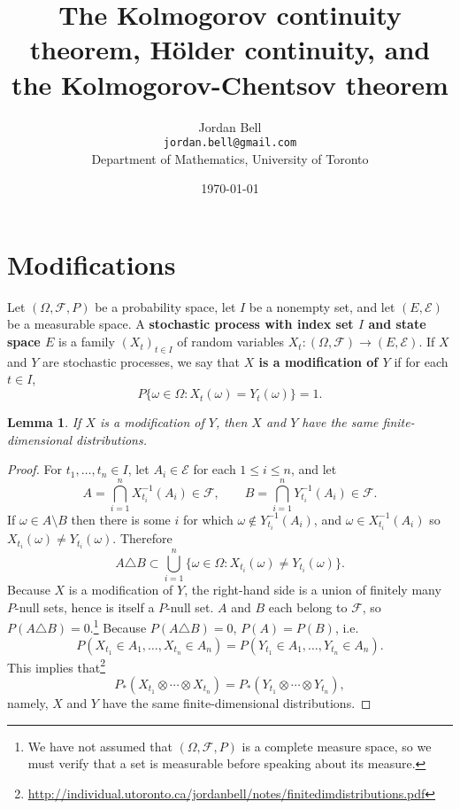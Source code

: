 \documentclass{article}
\newtheorem{lemma}[theorem]{Lemma}
\theoremstyle{definition}
\begin{document}
\title{The Kolmogorov continuity theorem, H\"older continuity, and the Kolmogorov-Chentsov theorem}
\author{Jordan Bell\\ \texttt{jordan.bell@gmail.com}\\Department of Mathematics, University of Toronto}
\date{\today}

\maketitle

\section{Modifications}
Let $(\Omega,\mathscr{F},P)$ be a probability space, let $I$ be a nonempty set, and let
$(E,\mathscr{E})$ be a measurable space. A \textbf{stochastic process with index set $I$ and state space $E$} is a family 
$(X_t)_{t \in I}$ of random variables $X_t:(\Omega,\mathscr{F}) \to (E,\mathscr{E})$.
If $X$ and $Y$ are stochastic processes, we say that \textbf{$X$ is a modification of $Y$} if 
for each $t \in I$, 
\[
P\{\omega \in \Omega: X_t(\omega)=Y_t(\omega)\}=1.
\]

\begin{lemma}
If $X$ is a modification of $Y$, then $X$ and $Y$ have the same finite-dimensional distributions.
\end{lemma}
\begin{proof}
For $t_1,\ldots,t_n \in  I$, let $A_i \in \mathscr{E}$ for each $1 \leq i \leq n$, and let
\[
A = \bigcap_{i=1}^n X_{t_i}^{-1}(A_i) \in \mathscr{F}, \qquad B = \bigcap_{i=1}^n Y_{t_i}^{-1}(A_i) \in \mathscr{F}.
\]
If $\omega \in A \setminus B$ then there is some $i$ for which $\omega \not \in Y_{t_i}^{-1}(A_i)$, and
$\omega \in X_{t_i}^{-1}(A_i)$ so $X_{t_i}(\omega) \neq Y_{t_i}(\omega)$. Therefore
\[
A \triangle B \subset \bigcup_{i=1}^n \{\omega \in \Omega: X_{t_i}(\omega) \neq Y_{t_i}(\omega)\}.
\]
Because $X$ is a modification of $Y$, the right-hand side is a union of finitely many $P$-null sets,
hence is itself a $P$-null set.  $A$ and $B$ each belong to $\mathscr{F}$, so
$P(A \triangle B)=0$.\footnote{We have not assumed that $(\Omega,\mathscr{F},P)$ is a complete measure space, so we must verify
that a set is measurable before speaking about its measure.}
Because $P(A \triangle B)=0$, $P(A)=P(B)$, i.e.
\[
P(X_{t_1} \in A_1, \ldots, X_{t_n} \in A_n) = P(Y_{t_1} \in A_1, \ldots, Y_{t_n} \in A_n).
\]
This implies that\footnote{\url{http://individual.utoronto.ca/jordanbell/notes/finitedimdistributions.pdf}}
\[
P_*(X_{t_1} \otimes \cdots \otimes X_{t_n}) = P_*(Y_{t_1} \otimes \cdots \otimes Y_{t_n}),
\]
namely,  $X$ and $Y$ have the same finite-dimensional distributions.
\end{proof}
\end{document}
